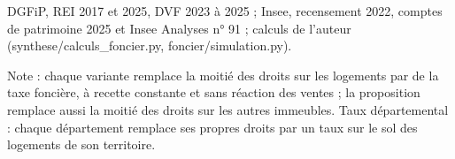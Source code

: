 DGFiP, REI 2017 et 2025, DVF 2023 à 2025 ; Insee, recensement 2022, comptes de patrimoine 2025 et Insee Analyses n° 91 ; calculs de l'auteur (synthese/calculs\_foncier.py, foncier/simulation.py).\par Note : chaque variante remplace la moitié des droits sur les logements par de la taxe foncière, à recette constante et sans réaction des ventes ; la proposition remplace aussi la moitié des droits sur les autres immeubles. Taux départemental : chaque département remplace ses propres droits par un taux sur le sol des logements de son territoire.
